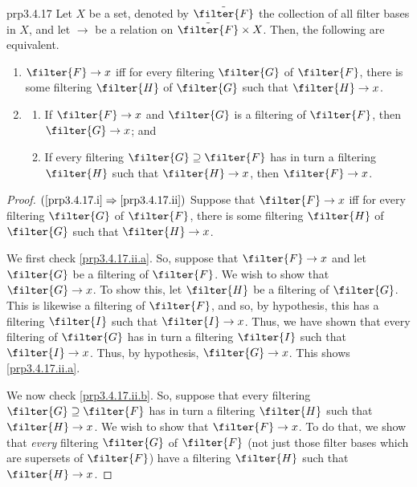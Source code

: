 \begin{prp}{}{prp3.4.17}
Let $X$ be a set, denoted by $\tilde{\filter{F}}$ the collection of all filter bases in $X$, and let $\to$ be a relation on $\tilde{\filter{F}}\times X$.  Then, the following are equivalent.
\begin{enumerate}
\item \label{prp3.4.17.i}$\filter{F}\to x$ iff for every filtering $\filter{G}$ of $\filter{F}$, there is some filtering $\filter{H}$ of $\filter{G}$ such that $\filter{H}\to x$.
\item \label{prp3.4.17.ii}
\begin{enumerate}
\item \label{prp3.4.17.ii.a}If $\filter{F}\to x$ and $\filter{G}$ is a filtering of $\filter{F}$, then $\filter{G}\to x$; and
\item \label{prp3.4.17.ii.b}If every filtering $\filter{G}\supseteq \filter{F}$ has in turn a filtering $\filter{H}$ such that $\filter{H}\to x$, then $\filter{F}\to x$.
\end{enumerate}
\end{enumerate}
\begin{proof}
$(\cref{prp3.4.17.i}\Rightarrow \cref{prp3.4.17.ii})$ Suppose that $\filter{F}\to x$ iff for every filtering $\filter{G}$ of $\filter{F}$, there is some filtering $\filter{H}$ of $\filter{G}$ such that $\filter{H}\to x$.

We first check \cref{prp3.4.17.ii.a}.  So, suppose that $\filter{F}\to x$ and let $\filter{G}$ be a filtering of $\filter{F}$.  We wish to show that $\filter{G}\to x$.  To show this, let $\filter{H}$ be a filtering of $\filter{G}$.  This is likewise a filtering of $\filter{F}$, and so, by hypothesis, this has a filtering $\filter{I}$ such that $\filter{I}\to x$.  Thus, we have shown that every filtering of $\filter{G}$ has in turn a filtering $\filter{I}$ such that $\filter{I}\to x$.  Thus, by hypothesis, $\filter{G}\to x$.  This shows \cref{prp3.4.17.ii.a}.

We now check \cref{prp3.4.17.ii.b}.  So, suppose that every filtering $\filter{G}\supseteq \filter{F}$ has in turn a filtering $\filter{H}$ such that $\filter{H}\to x$.  We wish to show that $\filter{F}\to x$.  To do that, we show that \emph{every} filtering $\filter{G}$ of $\filter{F}$ (not just those filter bases which are supersets of $\filter{F}$) have a filtering $\filter{H}$ such that $\filter{H}\to x$.


\end{proof}
\end{prp}
